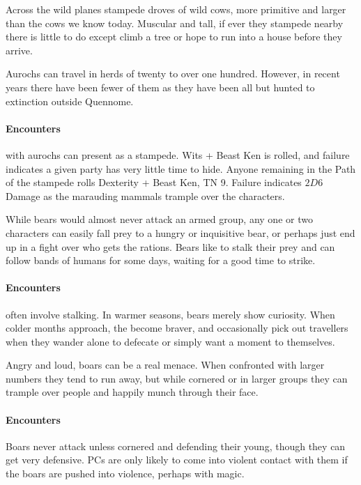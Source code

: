 
\auroch

Across the wild planes stampede droves of wild cows, more primitive and larger than the cows we know today.  Muscular and tall, if ever they stampede nearby there is little to do except climb a tree or hope to run into a house before they arrive.

	Aurochs can travel in herds of twenty to over one hundred.  However, in recent years there have been fewer of them as they have been all but hunted to extinction outside Quennome.

\paragraph{Encounters} with aurochs can present as a stampede.  Wits + Beast Ken is rolled, and failure indicates a given party has very little time to hide.  Anyone remaining in the Path of the stampede rolls Dexterity + Beast Ken, TN 9.  Failure indicates $2D6$ Damage as the marauding mammals trample over the characters.

\label{bear}

\bear

While bears would almost never attack an armed group, any one or two characters can easily fall prey to a hungry or inquisitive bear, or perhaps just end up in a fight over who gets the rations.  Bears like to stalk their prey and can follow bands of humans for some days, waiting for a good time to strike.

\paragraph{Encounters} often involve stalking.  In warmer seasons, bears merely show curiosity.  When colder months approach, the become braver, and occasionally pick out travellers when they wander alone to defecate or simply want a moment to themselves.

\label{boar}
\boar

Angry and loud, boars can be a real menace.  When confronted with larger numbers they tend to run away, but while cornered or in larger groups they can trample over people and happily munch through their face.

\paragraph{Encounters} Boars never attack unless cornered and defending their young, though they can get very defensive.  PCs are only likely to come into violent contact with them if the boars are pushed into violence, perhaps with magic.

